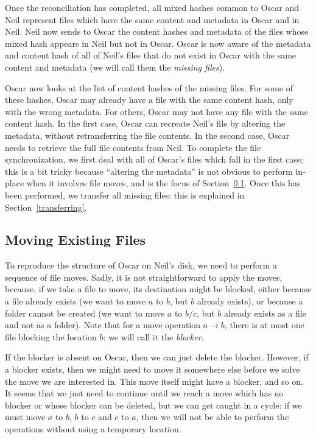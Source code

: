 \documentclass[11pt]{llncs}
\begin{document}
Once the reconciliation has completed, all mixed hashes common to Oscar and Neil
represent files which have the same content and metadata in Oscar and in Neil.
Neil now sends to Oscar the content hashes and metadata of the files whose mixed
hash appears in Neil but not in Oscar. Oscar is now aware of the metadata and
content hash of all of Neil's files that do not exist in Oscar with the same
content and metadata (we will call them the \emph{missing files}).

Oscar now looks at the list of content hashes of the missing files. For some of
these hashes, Oscar may already have a file with the same content hash, only
with the wrong metadata. For others, Oscar may not have any file with the same
content hash. In the first case, Oscar can recreate Neil's file by altering the
metadata, without retransferring the file contents. In the second case, Oscar
needs to retrieve the full file contents from Neil. To complete the file
synchronization, we first deal with all of Oscar's files which fall in the first
case: this is a bit tricky because ``altering the metadata'' is not obvious to
perform in-place when it involves file moves, and is the focus of
Section~\ref{moving}. Once this has been performed, we transfer all missing
files: this is explained in Section~\ref{transferring}.

\subsection{Moving Existing Files}
\label{moving}

To reproduce the structure of Oscar on Neil's disk, we need to perform a sequence of file moves. Sadly, it is not straightforward to apply the moves, because, if we take a file to move, its destination might be blocked, either because a file already exists (we want to move $a$ to $b$, but $b$ already exists), or because a folder cannot be created (we want to move $a$ to $b/c$, but $b$ already exists as a file and not as a folder). Note that for a move operation $a \rightarrow b$, there is at most one file blocking the location $b$: we will call it the {\sl blocker}.

If the blocker is absent on Oscar, then we can just delete the blocker. However, if a blocker exists, then we might need to move it somewhere else before we solve the move we are interested in. This move itself might have a blocker, and so on. It seems that we just need to continue until we reach a move which has no blocker or whose blocker can be deleted, but we can get caught in a cycle: if we must move $a$ to $b$, $b$ to $c$ and $c$ to $a$, then we will not be able to perform the operations without using a temporary location.
\end{document}
